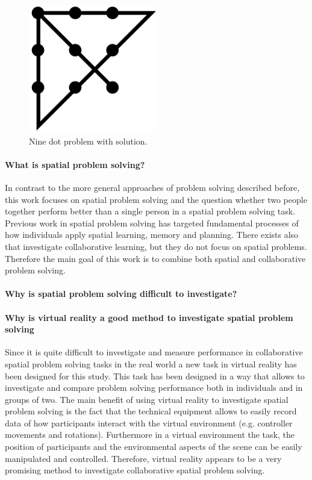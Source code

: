 \documentclass{article}
\begin{document}
\begin{figure}[h]
\centering
\includegraphics[width=0.5\textwidth]{ninedots}
\caption{Nine dot problem with solution.}
\label{fig:ninedots}
\end{figure}

\paragraph{What is spatial problem solving?}
In contrast to the more general approaches of problem solving described before, this work focuses on spatial problem solving and the question whether two people together perform better than a single person in a spatial problem solving task. 
Previous work in spatial problem solving has targeted fundamental processes of how individuals apply spatial learning, memory and planning. \cite{Waller2013} There exists also that investigate collaborative learning, but they do not focus on spatial problems. \cite{Dillenbourg1999} \cite{Hesse2015} Therefore the main goal of this work is to combine both spatial and collaborative problem solving.  

\paragraph{Why is spatial problem solving difficult to investigate?}
\paragraph{Why is virtual reality a good method to investigate spatial problem solving}
Since it is quite difficult to investigate and measure performance in collaborative spatial problem solving tasks in the real world a new task in virtual reality has been designed for this study. This task has been designed in a way that allows to investigate and compare problem solving performance both in individuals and in groups of two. The main benefit of using virtual reality to investigate spatial problem solving is the fact that the technical equipment allows to easily record data of how participants interact with the virtual environment (e.g. controller movements and rotations). Furthermore in a virtual environment the task, the position of participants and the environmental aspects of the scene can be easily manipulated and controlled. Therefore, virtual reality appears to be a very promising method to investigate collaborative spatial problem solving. 
\end{document}
